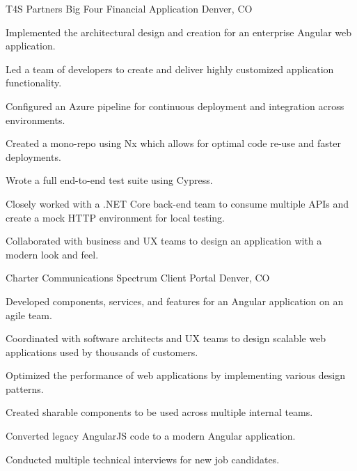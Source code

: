 \begin{cventries}
    \cventry
    {T4S Partners} %
    {Big Four Financial Application} %
    {Denver, CO} %
    {} %
    {
    \begin{cvitems} %
        \item {Implemented the architectural design and creation for an enterprise Angular web application.}
        \item {Led a team of developers to create and deliver highly customized application functionality.}
        \item {Configured an Azure pipeline for continuous deployment and integration across environments.}
        \item {Created a mono-repo using Nx which allows for optimal code re-use and faster deployments.}
        \item {Wrote a full end-to-end test suite using Cypress.}
        \item {Closely worked with a .NET Core back-end team to consume multiple APIs and create a mock HTTP environment for local testing.}
        \item {Collaborated with business and UX teams to design an application with a modern look and feel.}
    \end{cvitems}
    }

    \cventry
    {Charter Communications} %
    {Spectrum Client Portal} %
    {Denver, CO} %
    {} %
    {
    \begin{cvitems} %
        \item {Developed components, services, and features for an Angular application on an agile team.}
        \item {Coordinated with software architects and UX teams to design scalable web applications used by thousands of customers.}
        \item {Optimized the performance of web applications by implementing various design patterns.}
        \item {Created sharable components to be used across multiple internal teams.}
        \item {Converted legacy AngularJS code to a modern Angular application.}
        \item {Conducted multiple technical interviews for new job candidates.}
    \end{cvitems}
    }


\end{cventries}
